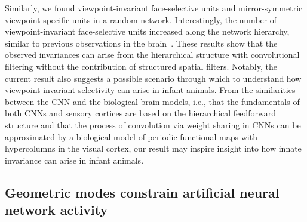 \documentclass[sn-mathphys-num]{sn-jnl}%
\theoremstyle{thmstyleone}%
\theoremstyle{thmstyletwo}%
\theoremstyle{thmstylethree}%
\begin{document}
Similarly, we found viewpoint-invariant face-selective units and mirror-symmetric viewpoint-specific units in a random network.
Interestingly, the number of viewpoint-invariant face-selective units increased along the network hierarchy, similar to previous observations in the brain~\cite{freiwald2010functional}.
These results show that the observed invariances can arise from the hierarchical structure with convolutional filtering without the contribution of structured spatial filters.
Notably, the current result also suggests a possible scenario through which to understand how viewpoint invariant selectivity can arise in infant animals.
From the similarities between the CNN and the biological brain models, i.e., that the fundamentals of both CNNs and sensory cortices are based on the hierarchical feedforward structure and that the process of convolution via weight sharing in CNNs can be approximated by a biological model of periodic functional maps with hypercolumns in the visual cortex,
our result may inspire insight into how innate invariance can arise in infant animals.


\subsection{Geometric modes constrain artificial neural network activity}\label{subsec2}
\end{document}
